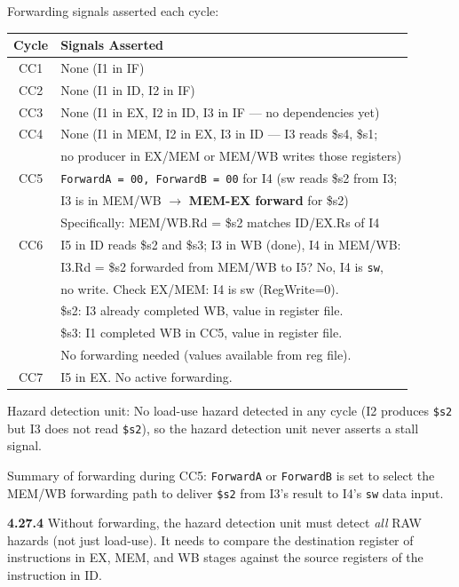Forwarding signals asserted each cycle:

\begin{center}
\begin{tabular}{cl}
\toprule
\textbf{Cycle} & \textbf{Signals Asserted} \\
\midrule
CC1 & None (I1 in IF) \\
CC2 & None (I1 in ID, I2 in IF) \\
CC3 & None (I1 in EX, I2 in ID, I3 in IF --- no dependencies yet) \\
CC4 & None (I1 in MEM, I2 in EX, I3 in ID --- I3 reads \$s4, \$s1; \\
    & \quad no producer in EX/MEM or MEM/WB writes those registers) \\
CC5 & \texttt{ForwardA = 00, ForwardB = 00} for I4 (sw reads \$s2 from I3; \\
    & \quad I3 is in MEM/WB $\to$ \textbf{MEM-EX forward} for \$s2) \\
    & \quad Specifically: MEM/WB.Rd = \$s2 matches ID/EX.Rs of I4 \\
CC6 & I5 in ID reads \$s2 and \$s3; I3 in WB (done), I4 in MEM/WB: \\
    & \quad I3.Rd = \$s2 forwarded from MEM/WB to I5? No, I4 is \texttt{sw}, \\
    & \quad no write. Check EX/MEM: I4 is sw (RegWrite=0). \\
    & \quad \$s2: I3 already completed WB, value in register file. \\
    & \quad \$s3: I1 completed WB in CC5, value in register file. \\
    & \quad No forwarding needed (values available from reg file). \\
CC7 & I5 in EX. No active forwarding. \\
\bottomrule
\end{tabular}
\end{center}

Hazard detection unit: No load-use hazard detected in any cycle (I2 produces
\texttt{\$s2} but I3 does not read \texttt{\$s2}), so the hazard detection unit
never asserts a stall signal.

Summary of forwarding during CC5: \texttt{ForwardA} or \texttt{ForwardB} is set
to select the MEM/WB forwarding path to deliver \texttt{\$s2} from I3's result
to I4's \texttt{sw} data input.

\medskip\noindent\textbf{4.27.4}
Without forwarding, the hazard detection unit must detect \emph{all} RAW
hazards (not just load-use). It needs to compare the destination register of
instructions in EX, MEM, and WB stages against the source registers of the
instruction in ID.

